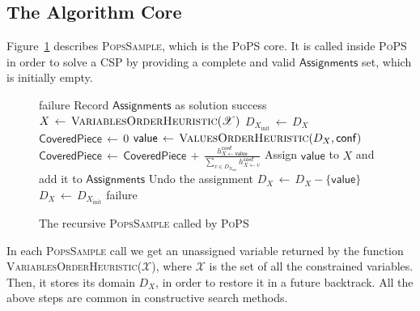 \documentclass{ws-ijait}
\begin{document}
\subsection{The Algorithm Core}

Figure~\ref{PopsSample} describes \textsc{PopsSample}, which is the \textsc{PoPS} core. It is called inside \textsc{PoPS} in order to solve a CSP by providing a complete and valid $\mathsf{Assignments}$ set, which is initially empty.

\begin{figure}
\centering
\begin{algorithmic}
                \State  \Return failure
                \State  Record $\mathsf{Assignments}$ as solution
                \State  \Return success
        \EndIf
        \State  $X \, \gets \, \Call{VariablesOrderHeuristic}{\mathscr{X}}$
        \State  $D_{X_\mathrm{init}} \, \gets \, D_X$
        \State  $\mathsf{CoveredPiece} \, \gets \, 0$
                \State  $\mathsf{value} \, \gets \, \Call{ValuesOrderHeuristic}{D_X, \mathsf{conf}}$
                \State  $\mathsf{CoveredPiece} \, \gets \, \mathsf{CoveredPiece} \, + \, \frac{h_{X \gets \mathsf{value}}^\mathsf{conf}}{\sum_{v \in D_{X_\mathrm{init}}} h_{X \gets v}^\mathsf{conf}}$
                \State  Assign $\mathsf{value}$ to $X$ and add it to $\mathsf{Assignments}$
                \State  {}
                \State  Undo the assignment
                \State  $D_X \, \gets \, D_X - \{\mathsf{value}\}$
        \EndWhile
        \State  $D_X \, \gets \, D_{X_\mathrm{init}}$
        \State  \Return failure
\EndFunction
\end{algorithmic}
\caption{The recursive {\normalfont\textsc{PopsSample}} called by {\normalfont\textsc{PoPS}}\label{PopsSample}}
\end{figure}

In each \textsc{PopsSample} call we get an unassigned variable returned by the function \textsc{VariablesOrderHeuristic}($\mathscr{X}$), where $\mathscr{X}$ is the set of all the constrained variables. Then, it stores its domain $D_X$, in order to restore it in a future backtrack. All the above steps are common in constructive search methods.
\end{document}
